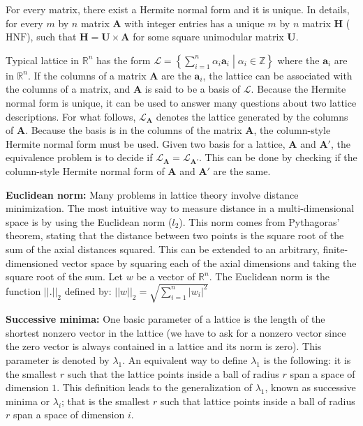For every matrix, there exist a Hermite normal form and it is unique. In details, for every $m$ by $n$ matrix $\textbf{A}$ with integer entries has a unique $m$ by $n$ matrix $\textbf{H}$ ($\mathrm{HNF}$), such that $\textbf{H}=\textbf{U} \times \textbf{A}$ for some square unimodular matrix $\textbf{U}$.

Typical lattice in $\mathbb{R}^{n}$ has the form $\mathcal{L}=\left\{\left.\sum _{i=1}^{n}\alpha _{i}\textbf{a}_{i}\;\right\vert \;\alpha _{i}\in {\mathbb {Z}}\right\}$ where the $\textbf{a}_i$ are in $\mathbb{R}^n$. If the columns of a matrix $\textbf{A}$ are the $\textbf{a}_i$, the lattice can be associated with the columns of a matrix, and $\textbf{A}$ is said to be a basis of $\mathcal{L}$. Because the Hermite normal form is unique, it can be used to answer many questions about two lattice descriptions. For what follows, $\mathcal{L}_{\textbf{A}}$ denotes the lattice generated by the columns of $\textbf{A}$. Because the basis is in the columns of the matrix $\textbf{A}$, the column-style Hermite normal form must be used. Given two basis for a lattice, $\textbf{A}$ and $\textbf{A}'$, the equivalence problem is to decide if $\mathcal{L}_{\textbf{A}}=\mathcal{L}_{\textbf{A}'}$. This can be done by checking if the column-style Hermite normal form of $\textbf{A}$ and $\textbf{A}'$ are the same.



\textbf{Euclidean norm:} Many problems in lattice theory involve distance minimization. The most intuitive way to measure distance in a multi-dimensional space is by using the Euclidean norm ($l_2$). This norm comes from Pythagoras' theorem, stating that the distance between two points is the square root of the sum of the axial distances squared. This can be extended to an arbitrary, finite-dimensioned vector space by squaring each of the axial dimensions and taking the square root of the sum. Let $w$ be a vector of $\mathbb{R}^n$. The Euclidean norm is the function $||.||_2$ defined by: $||w||_2 = \sqrt{\sum_{i=1}^n{|w_i|^2}}$

\textbf{Successive minima:}
One basic parameter of a lattice is the length of the shortest nonzero vector in the lattice (we have to ask for a nonzero vector since the zero vector is always contained in a lattice and its norm is zero). This parameter is denoted by $\lambda_1$. An equivalent way to define $\lambda_1$ is the following: it is the smallest $r$ such that the lattice points inside a ball of radius $r$ span a space of dimension $1$. This definition leads to the generalization of $\lambda_1$, known as successive minima or $\lambda_i$; that is the smallest $r$ such that lattice points inside a ball of radius $r$ span a space of dimension $i$.


